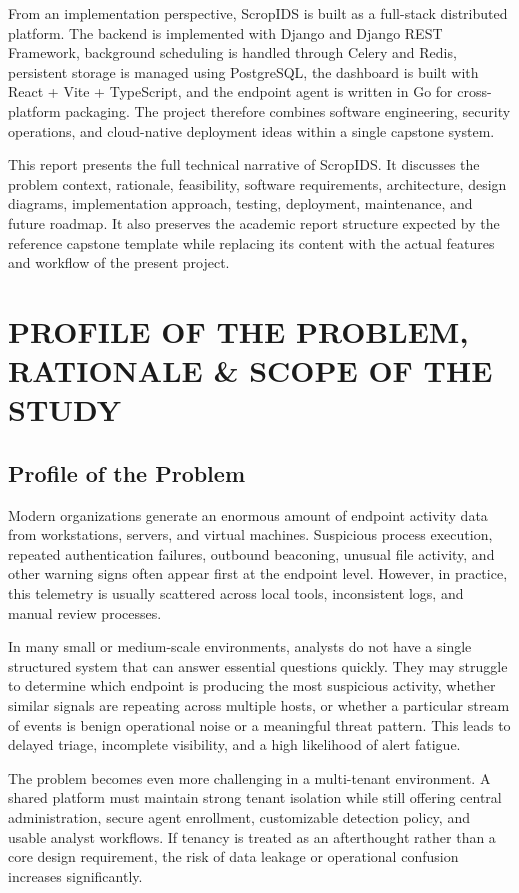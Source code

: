 \documentclass[12pt,a4paper]{article}
\begin{document}
From an implementation perspective, ScropIDS is built as a full-stack distributed platform. The backend is implemented with Django and Django REST Framework, background scheduling is handled through Celery and Redis, persistent storage is managed using PostgreSQL, the dashboard is built with React + Vite + TypeScript, and the endpoint agent is written in Go for cross-platform packaging. The project therefore combines software engineering, security operations, and cloud-native deployment ideas within a single capstone system.

This report presents the full technical narrative of ScropIDS. It discusses the problem context, rationale, feasibility, software requirements, architecture, design diagrams, implementation approach, testing, deployment, maintenance, and future roadmap. It also preserves the academic report structure expected by the reference capstone template while replacing its content with the actual features and workflow of the present project.

\setcounter{section}{1}

\clearpage
\section{PROFILE OF THE PROBLEM, RATIONALE \& SCOPE OF THE STUDY}

\subsection{Profile of the Problem}
Modern organizations generate an enormous amount of endpoint activity data from workstations, servers, and virtual machines. Suspicious process execution, repeated authentication failures, outbound beaconing, unusual file activity, and other warning signs often appear first at the endpoint level. However, in practice, this telemetry is usually scattered across local tools, inconsistent logs, and manual review processes.

In many small or medium-scale environments, analysts do not have a single structured system that can answer essential questions quickly. They may struggle to determine which endpoint is producing the most suspicious activity, whether similar signals are repeating across multiple hosts, or whether a particular stream of events is benign operational noise or a meaningful threat pattern. This leads to delayed triage, incomplete visibility, and a high likelihood of alert fatigue.

The problem becomes even more challenging in a multi-tenant environment. A shared platform must maintain strong tenant isolation while still offering central administration, secure agent enrollment, customizable detection policy, and usable analyst workflows. If tenancy is treated as an afterthought rather than a core design requirement, the risk of data leakage or operational confusion increases significantly.
\end{document}
